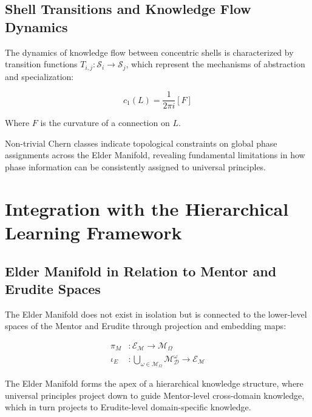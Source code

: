 \subsection{Shell Transitions and Knowledge Flow Dynamics}

The dynamics of knowledge flow between concentric shells is characterized by transition functions $T_{i,j}: \mathcal{S}_i \rightarrow \mathcal{S}_j$, which represent the mechanisms of abstraction and specialization:

\begin{equation}
c_1(L) = \frac{1}{2\pi i}[F]
\end{equation}

Where $F$ is the curvature of a connection on $L$.

\begin{theorem}
Non-trivial Chern classes indicate topological constraints on global phase assignments across the Elder Manifold, revealing fundamental limitations in how phase information can be consistently assigned to universal principles.
\end{theorem}

\section{Integration with the Hierarchical Learning Framework}

\subsection{Elder Manifold in Relation to Mentor and Erudite Spaces}

The Elder Manifold does not exist in isolation but is connected to the lower-level spaces of the Mentor and Erudite through projection and embedding maps:

\begin{equation}
\begin{aligned}
\pi_M &: \mathcal{E}_{\mathcal{M}} \rightarrow \mathcal{M}_{\Omega} \\
\iota_E &: \bigcup_{\omega \in \mathcal{M}_{\Omega}} \mathcal{M}_{\mathcal{D}}^{\omega} \rightarrow \mathcal{E}_{\mathcal{M}}
\end{aligned}
\end{equation}

\begin{theorem}
The Elder Manifold forms the apex of a hierarchical knowledge structure, where universal principles project down to guide Mentor-level cross-domain knowledge, which in turn projects to Erudite-level domain-specific knowledge.
\end{theorem}

